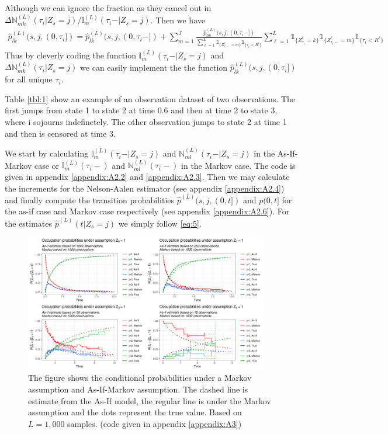 \documentclass[12pt,letter,twoside]{article}
\theoremstyle{plain}
\theoremstyle{definition}
\theoremstyle{remark}
\newcounter{example}
\begin{document}
Although we can ignore the fraction as they cancel out in $\Delta\mathbb N^{(L)}_{mk}(\tau_i\vert Z_s=j)/\mathbb I_m^{(L)}(\tau_i-\vert Z_s=j)$. Then we have
\begin{align}
\hat p^{(L)}_{lk}(s,j,(0,\tau_i])=\hat p^{(L)}_{lk}(s,j,(0,\tau_i-])+\sum_{m=1}^J \frac{\hat p^{(L)}_{lm}(s,j,(0,\tau_i-])}{\sum_{\ell = 1}^L\mathds 1_{\{Z_{\tau_i-}^\ell = m\}}\mathds 1_{\{\tau_i<R^\ell \}}}\sum_{\ell = 1}^L\mathds 1_{\{Z_{\tau_i}^\ell = k\}}\mathds 1_{\{Z_{\tau_i-}^\ell = m\}}\mathds 1_{\{\tau_i<R^\ell \}}
\end{align}
Thus by cleverly coding the function $\mathbb I^{(L)}_m(\tau_i- \vert Z_s=j)$ and $\Delta\mathbb N^{(L)}_{mk}(\tau_i\vert Z_s=j)$ we can easily implement the the function $\hat p^{(L)}_{lk}(s,j,(0,\tau_i])$ for all unique $\tau_i$.

Table \ref{tbl:1} show an example of an observation dataset of two observations. The first jumps from state 1 to state 2 at time 0.6 and then at time 2 to state 3, where i sojourns indefinetely. The other observation jumps to state 2 at time 1 and then is censored at time 3.

We start by calculating $\mathbb I^{(L)}_m(\tau_i- \vert Z_s=j)$ and $\mathbb N^{(L)}_{ml}(\tau_i- \vert Z_s=j)$ in the As-If-Markov case or $\mathbb I^{(L)}_m(\tau_i- )$ and $\mathbb N^{(L)}_{ml}(\tau_i-)$ in the Markov case. The code is given in appendix \ref{appendix:A2.2} and \ref{appendix:A2.3}. Then we may calculate the increments for the Nelson-Aalen estimator (see appendix \ref{appendix:A2.4}) and finally compute the transition probabilities $\hat p^{(L)}(s,j,(0,t])$ and $p(0,t]$ for the as-if case and Markov case respectively (see appendix \ref{appendix:A2.6}). For the estimates $\hat p^{(L)}(t\vert Z_s=j)$ we simply follow \ref{eq:5}.

\begin{figure}[h]
    \centering
    \includegraphics[width=0.95\textwidth]{Figures/plot1.png}
    \caption{The figure shows the conditional probabilities under a Markov assumption and As-If-Markov assumption. The dashed line is estimate from the As-If model, the  regular line is under the Markov assumption and the dots represent the true value. Based on $L=1,000$ samples. (code given in appendix \ref{appendix:A3})}
    \label{fig:2}
\end{figure}
\end{document}
